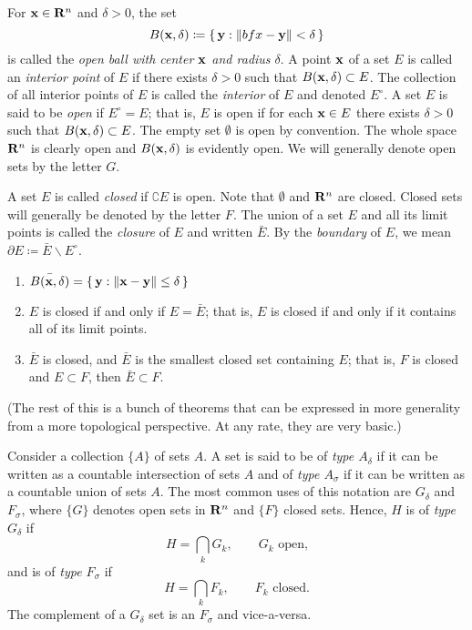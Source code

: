 For $\mathbf{x}\in\mathbf{R}^n$ and $\delta>0$, the set
\begin{equation}
\label{eq:open-ball-r-n}
B(\mathbf{x},\delta)\coloneqq\left\{\,\mathbf{y}:\|bfx-\mathbf{y}\|<\delta\,\right\}
\end{equation}
is called the \emph{open ball with center $\mathbf{x}$ and radius $\delta$}. A
point $\mathbf{x}$ of a set $E$ is called an \emph{interior point} of $E$ if
there exists $\delta>0$ such that $B(\mathbf{x},\delta)\subset E$. The collection
of all interior points of $E$ is called the \emph{interior} of $E$ and
denoted $E^\circ$. A set $E$ is said to be \emph{open} if $E^\circ=E$; that
is, $E$ is open if for each $\mathbf{x}\in E$ there exists $\delta>0$ such that
$B(\mathbf{x},\delta)\subset E$. The empty set $\emptyset$ is open by
convention. The whole space $\mathbf{R}^n$ is clearly open and $B(\mathbf{x},\delta)$
is evidently open. We will generally denote open sets by the letter $G$.

A set $E$ is called \emph{closed} if $\complement E$ is open. Note that
$\emptyset$ and $\mathbf{R}^n$ are closed. Closed sets will generally be denoted
by the letter $F$. The union of a set $E$ and all its limit points is
called the \emph{closure} of $E$ and written $\bar E$. By the
\emph{boundary} of $E$, we mean $\partial E\coloneqq \bar E\smallsetminus
E^\circ$.
\begin{theorem}[1.5]
\begin{enumerate}[label=\textnormal{(\roman*)}]
\item $\bar{B(\mathbf{x},\delta)}=\left\{\,\mathbf{y}:\|\mathbf{x}-\mathbf{y}\|\leq\delta\, \right\}$
\item $E$ is closed if and only if $E=\bar E$; that is, $E$ is closed if
  and only if it contains all of its limit points.
\item $\bar E$ is closed, and $\bar E$ is the smallest closed set
  containing $E$; that is, $F$ is closed and $E\subset F$, then $\bar
  E\subset F$.
\end{enumerate}
\end{theorem}

(The rest of this is a bunch of theorems that can be expressed in more
generality from a more topological perspective. At any rate, they are very
basic.)

Consider a collection $\{A\}$ of sets $A$. A set is said to be of \emph{type
$A_\delta$} if it can be written as a countable intersection of sets $A$
and of \emph{type $A_\sigma$} if it can be written as a countable union of
sets $A$. The most common uses of this notation are $G_\delta$ and
$F_\sigma$, where $\{G\}$ denotes open sets in $\mathbf{R}^n$ and $\{F\}$ closed
sets. Hence, $H$ is of \emph{type $G_\delta$} if
\begin{equation}
  \label{eq:G-delta}
H=\bigcap_k G_k,\qquad \text{$G_k$ open,}
\end{equation}
and is of \emph{type $F_\sigma$} if
\begin{equation}
  \label{eq:F-sigma}
H=\bigcap_k F_k,\qquad\text{$F_k$ closed.}
\end{equation}
The complement of a $G_\delta$ set is an $F_\sigma$ and vice-a-versa.

